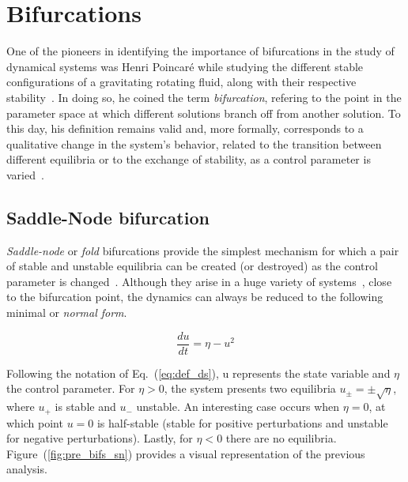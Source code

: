 \section{Bifurcations}

One of the pioneers in identifying the importance of bifurcations in the study of dynamical systems
was Henri Poincaré while studying the different stable
configurations of a gravitating rotating fluid, along with their respective stability~\cite{poincare1885equilibre}. 
In doing so, he coined the
term {\em bifurcation}, refering to the point in the parameter space at which different solutions branch off from another solution.
To this day, his definition remains valid and, more formally, corresponds to a qualitative change 
in the system's behavior, related to the transition between different equilibria or to the exchange of stability,
as a control parameter is varied~\cite{strogatz2018nonlinear}.



\subsection{Saddle-Node bifurcation}

{\em Saddle-node} or {\em fold} bifurcations provide the simplest mechanism 
for which a pair of stable and unstable equilibria can be created (or destroyed) 
as the control parameter is changed~\cite{strogatz2018nonlinear}. Although they 
arise in a huge variety of systems~\cite{Jackson_1989}, close to the bifurcation 
point, the dynamics can always be reduced to
the following minimal or {\em normal form}.

\begin{equation}
    \dfrac{du}{dt} = \eta - u^2
    \label{eq:pre_bif_sn}
\end{equation}

Following the notation of Eq.~(\ref{eq:def_ds}), u represents the state variable
and $\eta$ the control parameter. For $\eta > 0$, the system presents two equilibria $u_{\pm} = \pm\sqrt{\eta}$, where $u_+$ is
stable and $u_-$ unstable. An interesting case occurs when $\eta = 0$, at which point $u = 0$ is
half-stable (stable for positive perturbations and unstable for negative perturbations). Lastly,
for $\eta < 0$ there are no equilibria. Figure~(\ref{fig:pre_bifs_sn}) provides a visual representation
of the previous analysis.

